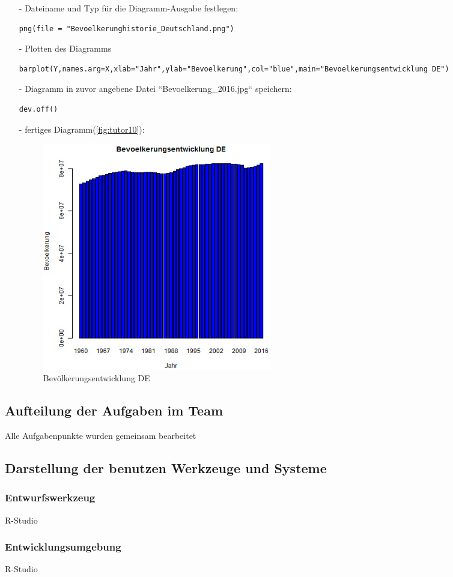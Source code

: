 \begin{itemize}
\item[-]Dateiname und Typ für die Diagramm-Ausgabe festlegen:
\begin{lstlisting}
png(file = "Bevoelkerunghistorie_Deutschland.png")
\end{lstlisting}
\item[-]Plotten des Diagramms
\begin{lstlisting}
barplot(Y,names.arg=X,xlab="Jahr",ylab="Bevoelkerung",col="blue",main="Bevoelkerungsentwicklung DE")
\end{lstlisting}
\item[-]Diagramm in zuvor angebene Datei ``Bevoelkerung\_2016.jpg`` speichern:
\begin{lstlisting}
dev.off()
\end{lstlisting}
\item[-]fertiges Diagramm(\autoref{fig:tutor10}):
\begin{figure}[!htb]
        \begin{minipage}{1\textwidth}
                \centering
                \includegraphics[width=0.50\textwidth]{pics/tutor10.png}\par\vspace{0cm}
                \caption{Bevölkerungsentwicklung DE}
                \label{fig:tutor10}
        \end{minipage}
\end{figure}
\end{itemize}
\subsection*{Aufteilung der Aufgaben im Team}
Alle Aufgabenpunkte wurden gemeinsam bearbeitet
\subsection*{Darstellung der benutzen Werkzeuge und Systeme}
\subsubsection*{Entwurfswerkzeug}
R-Studio
\subsubsection*{Entwicklungsumgebung}
R-Studio

